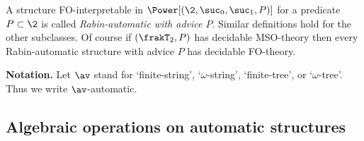 A structure FO-interpretable in $\Power[(\2,\suc_0,\suc_1,P)]$ for a predicate $P \subset \2$ is called
{\em Rabin-automatic with advice $P$}. Similar definitions hold for the other subclasses.
Of course if $(\frakT_2,P)$ has decidable MSO-theory then every Rabin-automatic structure with advice $P$
has decidable FO-theory.

{\bf Notation.} Let $\av$ stand for `finite-string', `$\omega$-string', `finite-tree', or `$\omega$-tree'.
Thus we write $\av$-automatic.

%




\subsection{Algebraic operations on automatic structures}

